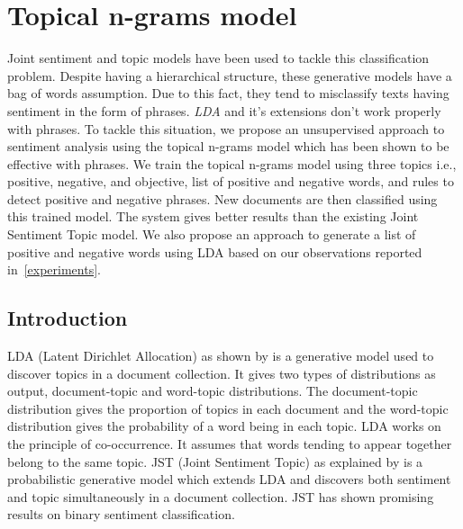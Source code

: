 
\chapter{Topical n-grams model} %

\label{topicalngram} %



Joint sentiment and topic models have been used to tackle this classification problem. Despite having a hierarchical structure, these generative models have
a bag of words assumption. Due to this fact, they tend to misclassify texts having sentiment in the form of phrases. \textit{LDA} and it's extensions don't 
work properly with phrases. To tackle this situation, we propose an unsupervised approach to sentiment analysis using the topical n-grams model which has been
shown to be effective with phrases. We train the topical n-grams model using three topics i.e., positive, negative, and objective, list of positive and negative
words, and rules to detect positive and negative phrases. New documents are then classified using this trained model. The system gives better results than the 
existing Joint Sentiment Topic model. We also propose an approach to generate a list of positive and negative words using LDA based on our observations reported in~\cref{experiments}.

\section{Introduction}

LDA (Latent Dirichlet Allocation) as shown by \citep*{blei2003latent} is a generative model used to discover topics in a document collection. It gives two 
types of distributions as output, document-topic and word-topic distributions. The document-topic distribution gives the proportion of topics in each document
and the word-topic distribution gives the probability of a word being in each topic. LDA works on the principle of co-occurrence. It assumes that words tending
to appear together belong to the same topic. JST (Joint Sentiment Topic) as explained by \citep*{lin2009joint} is a probabilistic generative model which extends
LDA and discovers both sentiment and topic simultaneously in a document collection. JST has shown promising results on binary sentiment classification. 

